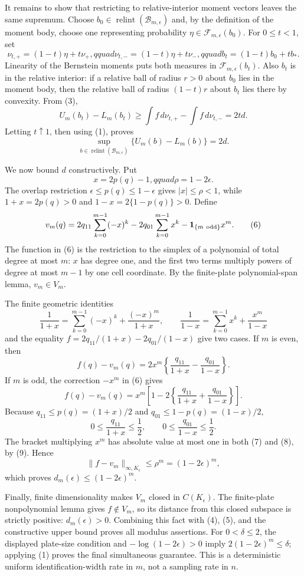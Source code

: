 It remains to show that restricting to relative-interior moment vectors leaves the same supremum.  Choose \(b_0\in\operatorname{relint}(\mathcal B_{m,\epsilon})\) and, by the definition of the moment body, choose one representing probability \(\eta\in\mathcal F_{m,\epsilon}(b_0)\).  For \(0\leq t<1\), set
\[
 \nu_{t,+}=(1-t)\eta+t\nu_+,qquad
 \nu_{t,-}=(1-t)\eta+t\nu_-,qquad
 b_t=(1-t)b_0+tb_*.
\]
Linearity of the Bernstein moments puts both measures in \(\mathcal F_{m,\epsilon}(b_t)\).  Also \(b_t\) is in the relative interior: if a relative ball of radius \(r>0\) about \(b_0\) lies in the moment body, then the relative ball of radius \((1-t)r\) about \(b_t\) lies there by convexity.  From (3),
\[
 U_m(b_t)-L_m(b_t)
 \geq\int f\,d\nu_{t,+}-\int f\,d\nu_{t,-}
 =2td.
\]
Letting \(t\uparrow1\), then using (1), proves
\[
 \sup_{b\in\operatorname{relint}(\mathcal B_{m,\epsilon})}
 \{U_m(b)-L_m(b)\}=2d. \tag{5}
\]

We now bound \(d\) constructively.  Put
\[
 x=2p(q)-1,qquad \rho=1-2\epsilon.
\]
The overlap restriction \(\epsilon\leq p(q)\leq1-\epsilon\) gives \(|x|\leq\rho<1\), while \(1+x=2p(q)>0\) and \(1-x=2\{1-p(q)\}>0\).  Define
\[
 v_m(q)=2q_{11}\sum_{k=0}^{m-1}(-x)^k
          -2q_{01}\sum_{k=0}^{m-1}x^k
          -\mathbf 1_{\{m\ {\rm odd}\}}x^m. \tag{6}
\]
The function in (6) is the restriction to the simplex of a polynomial of total degree at most \(m\): \(x\) has degree one, and the first two terms multiply powers of degree at most \(m-1\) by one cell coordinate.  By the finite-plate polynomial-span lemma, \(v_m\in V_m\).

The finite geometric identities
\[
 \frac1{1+x}=\sum_{k=0}^{m-1}(-x)^k+\frac{(-x)^m}{1+x},
 \qquad
 \frac1{1-x}=\sum_{k=0}^{m-1}x^k+\frac{x^m}{1-x}
\]
and the equality \(f=2q_{11}/(1+x)-2q_{01}/(1-x)\) give two cases.  If \(m\) is even, then
\[
 f(q)-v_m(q)
 =2x^m\left\{\frac{q_{11}}{1+x}-\frac{q_{01}}{1-x}\right\}. \tag{7}
\]
If \(m\) is odd, the correction \(-x^m\) in (6) gives
\[
 f(q)-v_m(q)
 =x^m\left[1-2\left\{\frac{q_{11}}{1+x}+\frac{q_{01}}{1-x}\right\}\right]. \tag{8}
\]
Because \(q_{11}\leq p(q)=(1+x)/2\) and \(q_{01}\leq1-p(q)=(1-x)/2\),
\[
 0\leq\frac{q_{11}}{1+x}\leq\frac12,
 \qquad
 0\leq\frac{q_{01}}{1-x}\leq\frac12. \tag{9}
\]
The bracket multiplying \(x^m\) has absolute value at most one in both (7) and (8), by (9).  Hence
\[
 \|f-v_m\|_{\infty,K_{\epsilon}}\leq\rho^m=(1-2\epsilon)^m,
\]
which proves \(d_m(\epsilon)\leq(1-2\epsilon)^m\).

Finally, finite dimensionality makes \(V_m\) closed in \(C(K_{\epsilon})\).  The finite-plate nonpolynomial lemma gives \(f\notin V_m\), so its distance from this closed subspace is strictly positive: \(d_m(\epsilon)>0\).  Combining this fact with (4), (5), and the constructive upper bound proves all modulus assertions.  For \(0<\delta\leq2\), the displayed plate-size condition and \(-\log(1-2\epsilon)>0\) imply \(2(1-2\epsilon)^m\leq\delta\); applying (1) proves the final simultaneous guarantee.  This is a deterministic uniform identification-width rate in \(m\), not a sampling rate in \(n\).